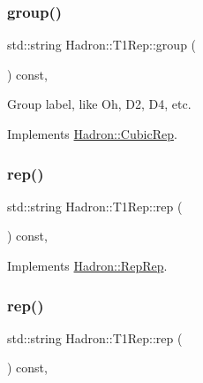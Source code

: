 \subsubsection{\texorpdfstring{group()}{group()}\hspace{0.1cm}{\footnotesize\ttfamily [2/2]}}
{\footnotesize\ttfamily std\+::string Hadron\+::\+T1\+Rep\+::group (\begin{DoxyParamCaption}{ }\end{DoxyParamCaption}) const\hspace{0.3cm}{\ttfamily [inline]}, {\ttfamily [virtual]}}

Group label, like Oh, D2, D4, etc. 

Implements \mbox{\hyperlink{structHadron_1_1CubicRep_a0748f11ec87f387062c8e8981339a29c}{Hadron\+::\+Cubic\+Rep}}.

\mbox{\label{structHadron_1_1T1Rep_ad64cbc6c40d059a9cee94bab5f8614ce}} 
\subsubsection{\texorpdfstring{rep()}{rep()}\hspace{0.1cm}{\footnotesize\ttfamily [1/3]}}
{\footnotesize\ttfamily std\+::string Hadron\+::\+T1\+Rep\+::rep (\begin{DoxyParamCaption}{ }\end{DoxyParamCaption}) const\hspace{0.3cm}{\ttfamily [inline]}, {\ttfamily [virtual]}}



Implements \mbox{\hyperlink{structHadron_1_1RepRep_ab3213025f6de249f7095892109575fde}{Hadron\+::\+Rep\+Rep}}.

\mbox{\label{structHadron_1_1T1Rep_ad64cbc6c40d059a9cee94bab5f8614ce}} 
\subsubsection{\texorpdfstring{rep()}{rep()}\hspace{0.1cm}{\footnotesize\ttfamily [2/3]}}
{\footnotesize\ttfamily std\+::string Hadron\+::\+T1\+Rep\+::rep (\begin{DoxyParamCaption}{ }\end{DoxyParamCaption}) const\hspace{0.3cm}{\ttfamily [inline]}, {\ttfamily [virtual]}}



